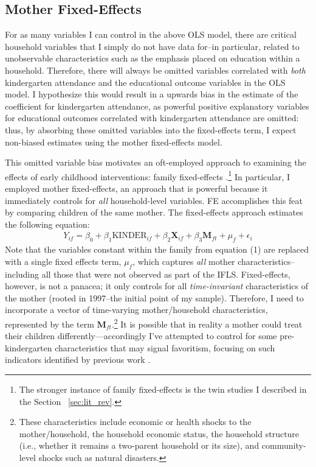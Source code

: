 \subsection{Mother Fixed-Effects}
	\label{sec:fe}
For as many variables I can control in the above OLS model, there are critical household variables that I simply do not have data for--in particular, related to unobservable characteristics such as the emphasis placed on education within a household. Therefore, there will always be omitted variables correlated with \textit{both} kindergarten attendance and the educational outcome variables in the OLS model. I hypothesize this would result in a upwards bias in the estimate of the coefficient for kindergarten attendance, as powerful positive explanatory variables for educational outcomes correlated with kindergarten attendance are omitted: thus, by absorbing these omitted variables into the fixed-effects term, I expect non-biased estimates using the mother fixed-effects model.

This omitted variable bias motivates an oft-employed approach to examining the effects of early childhood interventions: family fixed-effects \citep{Currie1993,Garces2000}.\footnote{The stronger instance of family fixed-effects is the twin studies I described in the Section ~\ref{sec:lit_rev}.} In particular, I employed mother fixed-effects, an approach that is powerful because it immediately controls for \textit{all} household-level variables. FE accomplishes this feat by comparing children of the same mother. The fixed-effects approach estimates the following equation:
\begin{gather}
	Y_{if} = \beta_0 + \beta_1\text{KINDER}_{if} + \beta_2\mathbf{X}_{if} + \beta_3\mathbf{M}_{ft} + \mu_f + \epsilon_i
\end{gather}
Note that the variables constant within the family from equation (1) are replaced with a single fixed effects term, $\mu_f$, which captures \textit{all} mother characteristics--including all those that were not observed as part of the IFLS. Fixed-effects, however, is not a panacea; it only controls for all \textit{time-invariant} characteristics of the mother (rooted in 1997--the initial point of my sample). Therefore, I need to incorporate a vector of time-varying mother/household characteristics, represented by the term $\mathbf{M}_{ft}$.\footnote{These characteristics include economic or health shocks to the mother/household, the household economic status, the household structure (i.e., whether it remains a two-parent household or its size), and community-level shocks such as natural disasters.} It is possible that in reality a mother could treat their children differently—accordingly I’ve attempted to control for some pre-kindergarten characteristics that may signal favoritism, focusing on such indicators identified by previous work \citep{Garces2000}. 

